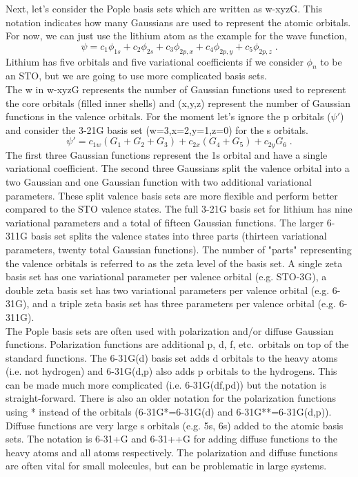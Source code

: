 \documentclass[12pt]{report}
\begin{document}
Next, let's consider the Pople basis sets which are written as w-xyzG. This
notation indicates how many Gaussians are used to represent the atomic
orbitals. For now, we can just use the lithium atom as the example for the
wave function,
\begin{equation}
 \psi = c_1\phi_{1s} + c_2\phi_{2s} + c_3\phi_{2p,x} +
 c_4\phi_{2p,y} + c_5\phi_{2p,z} \; .
\end{equation}
Lithium has five orbitals and five variational coefficients if we consider
$\phi_n$ to be an STO, but we are going to use more complicated basis sets. \\

The w in w-xyzG represents the number of Gaussian functions used to represent
the core orbitals (filled inner shells) and (x,y,z) represent the number of
Gaussian functions in the valence orbitals. For the moment let's ignore the p
orbitals ($\psi'$) and consider the 3-21G basis set (w=3,x=2,y=1,z=0) for the
s orbitals.
\begin{equation}
 \psi' = c_{1w}(G_1+G_2+G_3)+c_{2x}(G_4+G_5)+c_{2y}G_6 \; .
\end{equation}
The first three Gaussian functions represent the 1s orbital and have a single
variational coefficient. The second three Gaussians split the valence orbital
into a two Gaussian and one Gaussian function with two additional variational
parameters. These split valence basis sets are more flexible and perform
better compared to the STO valence states. The full 3-21G basis set for
lithium has nine variational parameters and a total of fifteen Gaussian
functions. The larger 6-311G basis set splits the valence states into three
parts (thirteen variational parameters, twenty total Gaussian functions). The
number of "parts" representing the valence orbitals is referred to as the zeta
level of the basis set. A single zeta basis set has one variational parameter
per valence orbital (e.g. STO-3G), a double zeta basis set has two variational
parameters per valence orbital (e.g. 6-31G), and a triple zeta basis set has
three parameters per valence orbital (e.g. 6-311G). \\

The Pople basis sets are often used with polarization and/or diffuse Gaussian
functions. Polarization functions are additional p, d, f, etc.\ orbitals on
top of the standard functions. The 6-31G(d) basis set adds d orbitals to the
heavy atoms (i.e. not hydrogen) and 6-31G(d,p) also adds p orbitals to the
hydrogens. This can be made much more complicated (i.e. 6-31G(df,pd)) but the
notation is straight-forward. There is also an older notation for the
polarization functions using * instead of the orbitals (6-31G*=6-31G(d) and
6-31G**=6-31G(d,p)). Diffuse functions are very large s orbitals (e.g. 5s, 6s)
added to the atomic basis sets. The notation is 6-31+G and 6-31++G for adding
diffuse functions to the heavy atoms and all atoms respectively. The
polarization and diffuse functions are often vital for small molecules, but
can be problematic in large systems. \\
\end{document}
